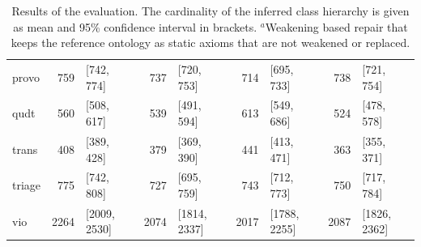 \begin{table}[htbp]
\begin{tabular}{|l|r@{ }lr@{ }lr@{ }lr@{ }l|}
    provo & 759 & [742, 774] & 737 & [720, 753] & 714 & [695, 733] & 738 & [721, 754] \\
    qudt & 560 & [508, 617] & 539 & [491, 594] & 613 & [549, 686] & 524 & [478, 578] \\
    trans & 408 & [389, 428] & 379 & [369, 390] & 441 & [413, 471] & 363 & [355, 371] \\
    triage & 775 & [742, 808] & 727 & [695, 759] & 743 & [712, 773] & 750 & [717, 784] \\
    vio & 2264 & [2009, 2530] & 2074 & [1814, 2337] & 2017 & [1788, 2255] & 2087 & [1826, 2362] \\
    \hline
  \end{tabular}
  \caption{Results of the evaluation. The cardinality of the inferred class hierarchy is given as mean and 95\% confidence interval in brackets. $^a$Weakening based repair that keeps the reference ontology as static axioms that are not weakened or replaced.}
\end{table}

